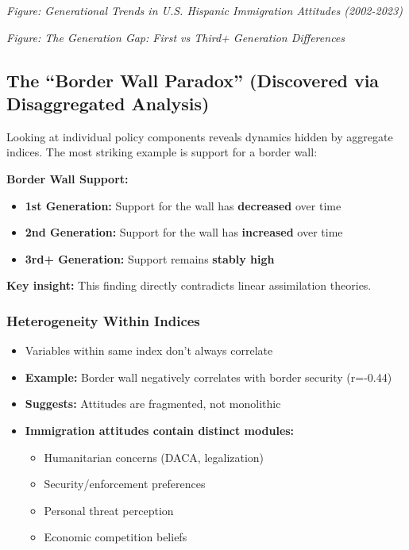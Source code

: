 \documentclass[11pt,letterpaper]{article}
\begin{document}
\textit{Figure: Generational Trends in U.S. Hispanic Immigration Attitudes (2002-2023)}

\textit{Figure: The Generation Gap: First vs Third+ Generation Differences}

\subsection{The ``Border Wall Paradox'' (Discovered via Disaggregated Analysis)}

Looking at individual policy components reveals dynamics hidden by aggregate indices. The most striking example is support for a border wall:

\textbf{Border Wall Support:}
\begin{itemize}
    \item \textbf{1st Generation:} Support for the wall has \textbf{decreased} over time
    \item \textbf{2nd Generation:} Support for the wall has \textbf{increased} over time
    \item \textbf{3rd+ Generation:} Support remains \textbf{stably high}
\end{itemize}

\textbf{Key insight:} This finding directly contradicts linear assimilation theories.

\subsubsection{Heterogeneity Within Indices}
\begin{itemize}
    \item Variables within same index don't always correlate
    \item \textbf{Example:} Border wall negatively correlates with border security (r=-0.44)
    \item \textbf{Suggests:} Attitudes are fragmented, not monolithic
    \item \textbf{Immigration attitudes contain distinct modules:}
    \begin{itemize}
        \item Humanitarian concerns (DACA, legalization)
        \item Security/enforcement preferences
        \item Personal threat perception
        \item Economic competition beliefs
    \end{itemize}
\end{itemize}
\end{document}
